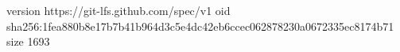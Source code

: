 version https://git-lfs.github.com/spec/v1
oid sha256:1fea880b8e17b7b41b964d3c5e4dc42eb6ccec062878230a0672335ec8174b71
size 1693
